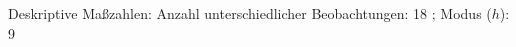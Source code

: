 				\label{tableValues:astu013k_g3r}
				\vspace*{-\baselineskip}
                    \begin{noten}
                	    \note{} Deskriptive Maßzahlen:
                	    Anzahl unterschiedlicher Beobachtungen: 18%
                	    ; 
                	      Modus ($h$): 9
                     \end{noten}

